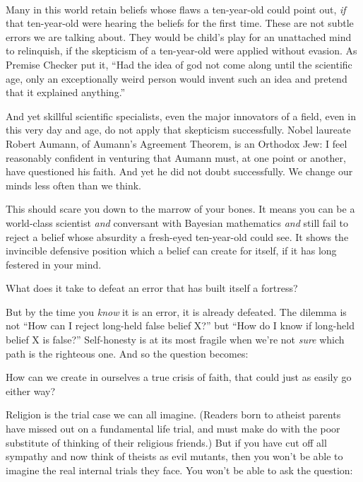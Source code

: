 \bigskip

{
 ~}

{
 Many in this world retain beliefs whose flaws a ten-year-old could
point out, \textit{if} that ten-year-old were hearing the beliefs for
the first time. These are not subtle errors we are talking about. They
would be child's play for an unattached mind to
relinquish, if the skepticism of a ten-year-old were applied without
evasion. As Premise Checker put it, ``Had the idea of
god not come along until the scientific age, only an exceptionally
weird person would invent such an idea and pretend that it explained
anything.''}

{
 And yet skillful scientific specialists, even the major innovators
of a field, even in this very day and age, do not apply that skepticism
successfully. Nobel laureate Robert Aumann, of Aumann's
Agreement Theorem, is an Orthodox Jew: I feel reasonably confident in
venturing that Aumann must, at one point or another, have questioned
his faith. And yet he did not doubt successfully. We change our minds
less often than we think.}

{
 This should scare you down to the marrow of your bones. It means
you can be a world-class scientist \textit{and} conversant with
Bayesian mathematics \textit{and} still fail to reject a belief whose
absurdity a fresh-eyed ten-year-old could see. It shows the invincible
defensive position which a belief can create for itself, if it has long
festered in your mind.}

{
 What does it take to defeat an error that has built itself a
fortress?}

{
 But by the time you \textit{know} it is an error, it is already
defeated. The dilemma is not ``How can I reject
long-held false belief X?'' but
``How do I know if long-held belief X is
false?'' Self-honesty is at its most fragile when
we're not \textit{sure} which path is the righteous
one. And so the question becomes:}

{
 How can we create in ourselves a true crisis of faith, that could
just as easily go either way?}

{
 Religion is the trial case we can all imagine. (Readers born to
atheist parents have missed out on a fundamental life trial, and must
make do with the poor substitute of thinking of their religious
friends.) But if you have cut off all sympathy and now think of theists
as evil mutants, then you won't be able to imagine the
real internal trials they face. You won't be able to
ask the question:}

